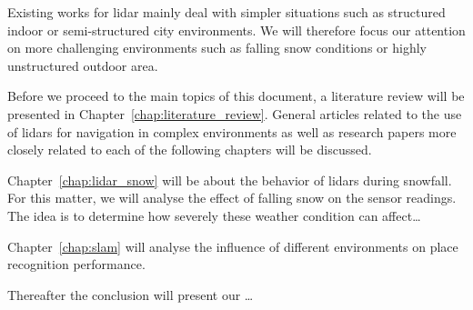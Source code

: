 
Existing works for \gls*{lidar} mainly deal with simpler situations such as structured indoor or semi-structured city environments. We will therefore focus our attention on more challenging environments such as falling snow conditions or highly unstructured outdoor area. 

Before we proceed to the main topics of this document, a literature review will be presented in Chapter~\ref{chap:literature_review}. General articles related to the use of \gls*{lidar}s for navigation in complex environments as well as research papers more closely related to each of the following chapters will be discussed. 

Chapter~\ref{chap:lidar_snow} will be about the behavior of \gls*{lidar}s during snowfall. For this matter, we will analyse the effect of falling snow on the sensor readings. The idea is to determine how severely these weather condition can affect\dots 

Chapter~\ref{chap:slam} will analyse the influence of different environments on place recognition performance.

Thereafter the conclusion will present our \dots
